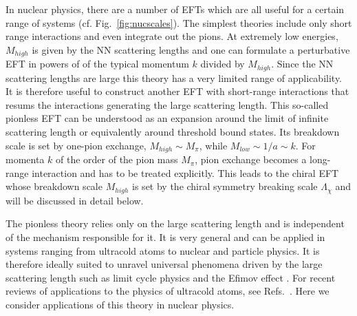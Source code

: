 \documentclass[aps,rmp,nofootinbib,twocolumn,floatfix]{revtex4}
\newcommand{\Mhi}{M_{high}}
\newcommand{\Mlo}{M_{low}}
\begin{document}
In nuclear physics, there are a number of EFTs which are all useful 
for a certain range of systems (cf. Fig.~\ref{fig:nucscales}). 
The simplest theories
include only short range interactions and even integrate out the pions.
At extremely low energies,
$\Mhi$ is given by the NN scattering lengths and one can formulate
a perturbative EFT in powers of of the typical momentum $k$ divided
by $\Mhi$. Since the NN scattering lengths are large this theory has
a very limited range of applicability. 
It is therefore useful to construct another EFT with short-range 
interactions that resums the interactions generating the large 
scattering length. This so-called pionless EFT 
can be understood as an expansion
around the limit of infinite scattering length or equivalently 
around threshold bound states. 
Its breakdown scale is set by one-pion exchange, $\Mhi\sim M_\pi$, while
$\Mlo \sim 1/a \sim k$.
For momenta $k$ of the order of the pion mass $M_\pi$, pion exchange becomes
a long-range interaction and has to be treated explicitly. This 
leads to the chiral EFT whose breakdown scale $\Mhi$ is set by the chiral
symmetry breaking scale $\Lambda_\chi$ and will be discussed in detail below. 

The pionless theory relies only on the large scattering length and 
is independent of the mechanism responsible for it. 
It is very general and can be applied in systems ranging from
ultracold atoms to nuclear and particle physics. It is therefore 
ideally suited to unravel universal phenomena driven by the 
large scattering length such as limit cycle physics 
\cite{Mohr:2005pv,Braaten:2003eu} and the Efimov effect \cite{Efimov-70}.
For recent reviews of applications to the physics of ultracold 
atoms, see Refs.~\cite{Braaten:2004rn,Braaten:2006vd}. 
Here we consider applications of this theory in nuclear physics.  
\end{document}
